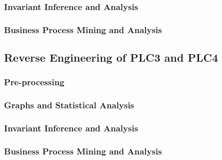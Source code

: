 \subsubsection{Invariant Inference and Analysis}
\label{subsubsec:6_P2P3_invariants}

\subsubsection{Business Process Mining and Analysis}
\label{subsubsec:6_P2P3_bpa}

\subsection{Reverse Engineering of PLC3 and PLC4}
\label{subsec:6_P3P4_analysis}

\subsubsection{Pre-processing}
\label{subsubsec:6_P3P4_preprocessing}

\subsubsection{Graphs and Statistical Analysis}
\label{subsubsec:6_P3P4_graphs}

\subsubsection{Invariant Inference and Analysis}
\label{subsubsec:6_P3P4_invariants}

\subsubsection{Business Process Mining and Analysis}
\label{subsubsec:6_P3P4_bpa}

\vfill
\nolinenumbers